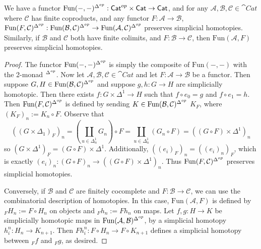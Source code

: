 \begin{lem}[label=lem:simpFuncCat]
    We have a functor $\text{Fun}(-,-)^{\Delta^{op}}:\textup{\textsf{Cat}}^{op}\times \textup{\textsf{Cat}}\to \textup{\textsf{Cat}}$, and for any $\mathcal{A},\mathcal{B},\mathcal{C} \in \cat{Cat}$ where $\mathcal{C}$ has finite coproducts, and any functor $F:\mathcal{A}\to \mathcal{B}$, $\text{Fun}(F,\mathcal{C})^{\Delta^{op}}:\text{Fun}(\mathcal{B},\mathcal{C})^{\Delta^{op}}\to \text{Fun}(\mathcal{A},\mathcal{C})^{\Delta^{op}}$ preserves simplicial homotopies. Similarly, if $\mathcal{B}$ and $\mathcal{C}$ both have finite colimits, and $F:\mathcal{B}\to \mathcal{C}$, then $\text{Fun}(\mathcal{A},F)$ preserves simplicial homotopies.
\end{lem}
\begin{proof}
    The functor $\text{Fun}(-,-)^{\Delta^{op}}$ is simply the composite of $\text{Fun}(-,-)$ with the 2-monad $^{\Delta^{op}}$. Now let $\mathcal{A},\mathcal{B},\mathcal{C} \in \cat{Cat}$ and let $F:\mathcal{A}\to \mathcal{B}$ be a functor. Then suppose $G,H \in \text{Fun}(\mathcal{B},\mathcal{C})^{\Delta^{op}}$ and suppose $g,h:G\to H$ are simplicially homotopic. Then there exists $f:G\times \Delta^1\to H$ such that $f\circ e_0 = g$ and $f\circ e_1 = h$. Then $\text{Fun}(F,\mathcal{C})^{\Delta^{op}}$ is defined by sending $K \in \text{Fun}(\mathcal{B},\mathcal{C})^{\Delta^{op}}$ $K_F$, where $(K_F)_n := K_n\circ F$. Observe that
    \begin{equation*}
        ((G\times \Delta_1)_F)_n = (\coprod_{u \in \Delta^1_n}G_n)\circ F = \coprod_{u \in \Delta^1_n}(G_n\circ F) = ((G\circ F)\times \Delta^1)_n
    \end{equation*}
    so $(G\times \Delta^1)_F = (G\circ F)\times \Delta^1$. Additionally, $((e_i)_F)_n= ((e_i)_n)_F$, which is exactly $(e_i)_n:(G\circ F)_n\to ((G\circ F)\times \Delta^1)_n$. Thus $\text{Fun}(F,\mathcal{C})^{\Delta^{op}}$ preserves simplicial homotopies.

    \vspace{10pt}

    Conversely, if $\mathcal{B}$ and $\mathcal{C}$ are finitely cocomplete and $F:\mathcal{B}\to \mathcal{C}$, we can use the combinatorial description of homotopies. In this case, $\text{Fun}(\mathcal{A},F)$ is defined by ${_F}H_n := F\circ H_n$ on objects and ${_F}h_n := Fh_n$ on maps. Let $f,g:H\to K$ be simplicially homotopic maps in $\text{Fun}(\mathcal{A},\mathcal{B})^{\Delta^{op}}$, by a simplicial homotopy $h_i^n:H_n\to K_{n+1}$. Then $Fh_i^n:F\circ H_n\to F\circ K_{n+1}$ defines a simplicial homotopy between ${_F}f$ and ${_F}g$, as desired.
\end{proof}


